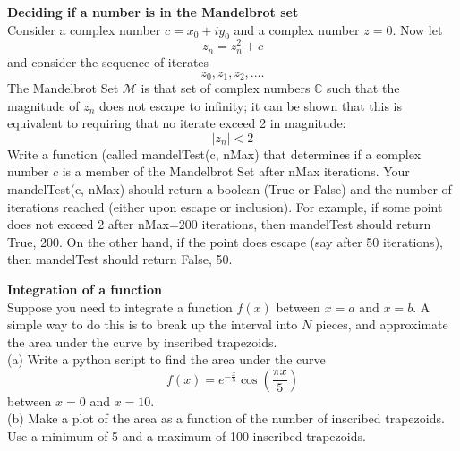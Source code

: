 \begin{prob}
\label{prob:mandelbrot}
\textbf{\large Deciding if a number is in the Mandelbrot set}\\
Consider a complex number $c = x_0 + iy_0$ and a complex number $z = 0$. Now let 
$$ z_n = z_n^2 + c$$ and consider the sequence of iterates
$$ z_0, z_1, z_2, \ldots .$$
The Mandelbrot Set $\mathcal{M}$ is that set of complex numbers $\mathbb{C}$ such that the magnitude of $z_n$ does not escape to infinity; it can be shown that this is equivalent to requiring that no iterate exceed 2 in magnitude:
$$ |z_n|  < 2   $$
Write a function (called mandelTest(c, nMax) that determines if a complex number $c$ is a member of the Mandelbrot Set after nMax iterations. Your mandelTest(c, nMax) should return a boolean (True or False) and the number of iterations reached (either upon escape or inclusion). For example, if some point does not exceed 2 after nMax=200 iterations, then mandelTest should return True, 200. On the other hand, if the point does escape (say after 50 iterations), then mandelTest should return False, 50. 
\end{prob}



\begin{prob}
\label{prob:integration}
\textbf{\large Integration of a function }\\
Suppose you need to integrate a function $f(x)$ between $x = a$ and $x = b$. A simple way to do this is to  break up the interval into $N$ pieces, and approximate the area under the curve by inscribed trapezoids.\\
 (a) Write a python script to find the area under the curve 
 $$f(x) = e^{-\frac{x}{5}} \cos(\frac{\pi x}{5}) $$
 between $x = 0$ and $x = 10$.\\
 (b) Make a plot of the area as a function of the number of inscribed trapezoids. Use a minimum of 5 and a maximum of 100 inscribed trapezoids. 

\end{prob}


